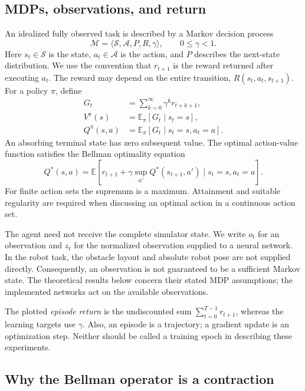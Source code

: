 \documentclass[11pt,a4paper]{article}
\theoremstyle{definition}
\theoremstyle{plain}
\theoremstyle{remark}
\newcommand{\E}{\mathbb{E}}
\begin{document}
\subsection{MDPs, observations, and return}

An idealized fully observed task is described by a Markov decision process
\[
  \mathcal M=\langle\mathcal S,\mathcal A,P,R,\gamma\rangle,
  \qquad 0\leq\gamma<1.
\]
Here $s_t\in\mathcal S$ is the state, $a_t\in\mathcal A$ is the action, and $P$ describes the next-state distribution. We use the convention that $r_{t+1}$ is the reward returned after executing $a_t$. The reward may depend on the entire transition, $R(s_t,a_t,s_{t+1})$. For a policy $\pi$, define
\begin{align}
  G_t &= \sum_{k=0}^{\infty}\gamma^k r_{t+k+1}, \\
  V^\pi(s) &= \E_\pi[G_t\mid s_t=s], \\
  Q^\pi(s,a) &= \E_\pi[G_t\mid s_t=s,a_t=a].
\end{align}
An absorbing terminal state has zero subsequent value. The optimal action-value function satisfies the Bellman optimality equation
\begin{equation}
 Q^*(s,a)=\E\!\left[r_{t+1}+\gamma\sup_{a'}Q^*(s_{t+1},a')\mid s_t=s,a_t=a\right].
 \label{eq:bellman}
\end{equation}
For finite action sets the supremum is a maximum. Attainment and suitable regularity are required when discussing an optimal action in a continuous action set.

The agent need not receive the complete simulator state. We write $o_t$ for an observation and $z_t$ for the normalized observation supplied to a neural network. In the robot task, the obstacle layout and absolute robot pose are not supplied directly. Consequently, an observation is not guaranteed to be a sufficient Markov state. The theoretical results below concern their stated MDP assumptions; the implemented networks act on the available observations.

The plotted \emph{episode return} is the undiscounted sum $\sum_{t=0}^{T-1}r_{t+1}$, whereas the learning targets use $\gamma$. Also, an episode is a trajectory; a gradient update is an optimization step. Neither should be called a training epoch in describing these experiments.

\subsection{Why the Bellman operator is a contraction}
\end{document}
